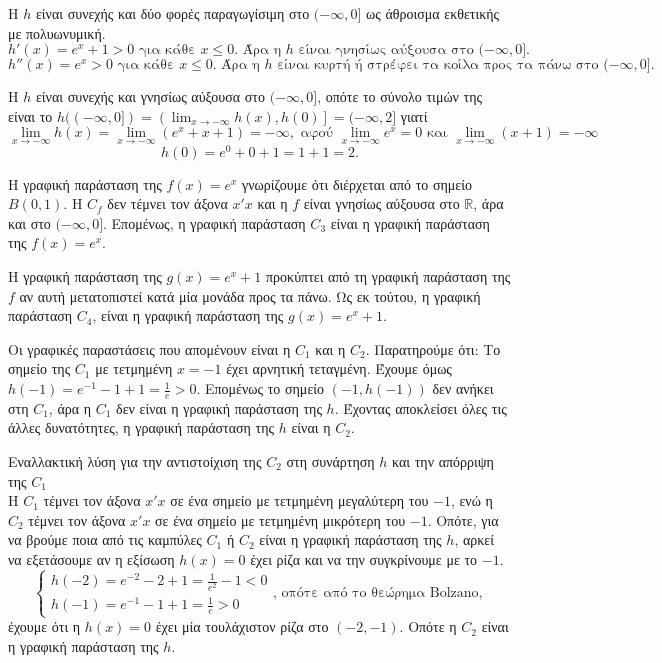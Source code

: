\OnPar{\textalpha)}
\begin{rlist}
    \item Η $h$ είναι συνεχής και δύο φορές παραγωγίσιμη στο $(-\infty,0]$ ως άθροισμα εκθετικής με πολυωνυμική.
    \[ h'(x) = e^x + 1 > 0 \text{ για κάθε } x \le 0. \text{ Άρα η } h \text{ είναι γνησίως αύξουσα στο } (-\infty,0]. \]
    \[ h''(x) = e^x > 0 \text{ για κάθε } x \le 0. \text{ Άρα η } h \text{ είναι κυρτή ή στρέφει τα κοίλα προς τα πάνω στο } (-\infty,0]. \]
    \item Η $h$ είναι συνεχής και γνησίως αύξουσα στο $(-\infty,0]$, οπότε το σύνολο τιμών της είναι το $h((-\infty,0]) = \left(\lim_{x \to -\infty} h(x), h(0)\right] = (-\infty,2]$
    γιατί
    \[ \lim_{x \to -\infty} h(x) = \lim_{x \to -\infty} (e^x + x + 1) = -\infty, \text{ αφού } \lim_{x \to -\infty} e^x = 0 \text{ και } \lim_{x \to -\infty} (x+1) = -\infty \]
    \[ h(0) = e^0 + 0 + 1 = 1 + 1 = 2. \]
\end{rlist}

\OnPar{\textbeta)}
\begin{rlist}
    \item Η γραφική παράσταση της $f(x) = e^x$ γνωρίζουμε ότι διέρχεται από το σημείο $B(0,1)$. Η $C_f$ δεν τέμνει τον άξονα $x'x$ και η $f$ είναι γνησίως αύξουσα στο $\mathbb{R}$, άρα και στο $(-\infty,0]$. Επομένως, η γραφική παράσταση $C_3$ είναι η γραφική παράσταση της $f(x) = e^x$.
    \item Η γραφική παράσταση της $g(x) = e^x + 1$ προκύπτει από τη γραφική παράσταση της $f$ αν αυτή μετατοπιστεί κατά μία μονάδα προς τα πάνω. Ως εκ τούτου, η γραφική παράσταση $C_4$, είναι η γραφική παράσταση της $g(x) = e^x + 1$.
    \item Οι γραφικές παραστάσεις που απομένουν είναι η $C_1$ και η $C_2$. Παρατηρούμε ότι: Το σημείο της $C_1$ με τετμημένη $x = -1$ έχει αρνητική τεταγμένη. Έχουμε όμως $h(-1) = e^{-1} - 1 + 1 = \frac{1}{e} > 0$. Επομένως το σημείο $(-1, h(-1))$ δεν ανήκει στη $C_1$, άρα η $C_1$ δεν είναι η γραφική παράσταση της $h$. Έχοντας αποκλείσει όλες τις άλλες δυνατότητες, η γραφική παράσταση της $h$ είναι η $C_2$.
    \item Εναλλακτική λύση για την αντιστοίχιση της $C_2$ στη συνάρτηση $h$ και την απόρριψη της $C_1$\\
    Η $C_1$ τέμνει τον άξονα $x'x$ σε ένα σημείο με τετμημένη μεγαλύτερη του $-1$, ενώ η $C_2$ τέμνει τον άξονα $x'x$ σε ένα σημείο με τετμημένη μικρότερη του $-1$. Οπότε, για να βρούμε ποια από τις καμπύλες $C_1$ ή $C_2$ είναι η γραφική παράσταση της $h$, αρκεί να εξετάσουμε αν η εξίσωση $h(x) = 0$ έχει ρίζα και να την συγκρίνουμε με το $-1$.
    \[
    \left\{
    \begin{array}{l}
    h(-2) = e^{-2} - 2 + 1 = \frac{1}{e^2} - 1 < 0 \\
    h(-1) = e^{-1} - 1 + 1 = \frac{1}{e} > 0
    \end{array}
    \right.
    \text{, οπότε από το θεώρημα Bolzano, }
    \]
    έχουμε ότι η $h(x) = 0$ έχει μία τουλάχιστον ρίζα στο $(-2,-1)$. Οπότε η $C_2$ είναι η γραφική παράσταση της $h$.
\end{rlist}

